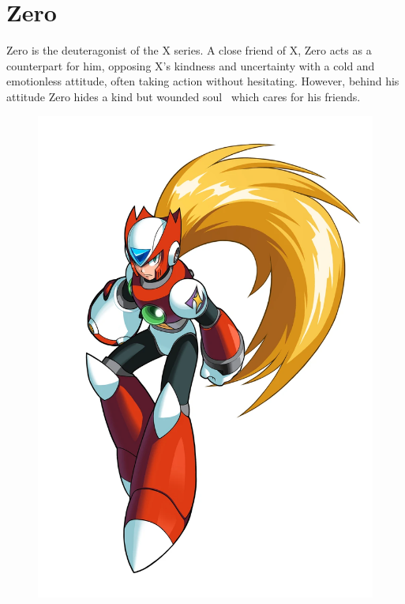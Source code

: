 \chapter{Zero}\label{char:Zero}
Zero is the deuteragonist of the X series. A close friend of X, Zero acts as a counterpart for him, opposing X's kindness and uncertainty with a cold and emotionless attitude, often taking action without hesitating. However, behind his attitude Zero hides a kind but wounded soul~\cite{wiki:Zero} which cares for his friends.

\begin{figure}[h]
	\centering
	\includegraphics[width=0.4\linewidth]{figures/Characters/Char_Z.png}
\end{figure}

